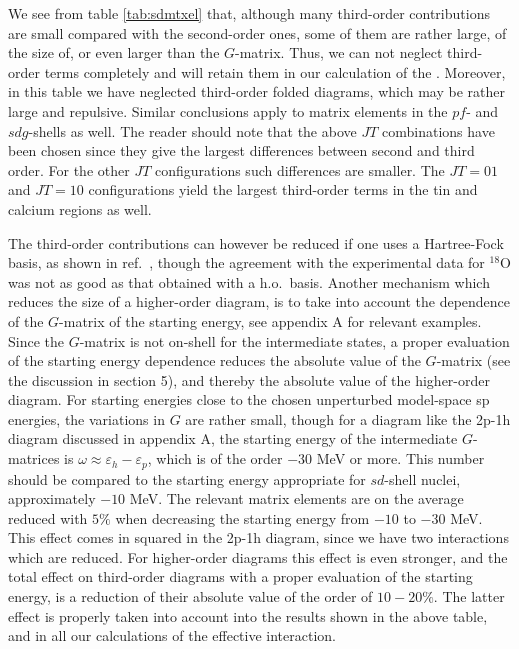 We see from table \ref{tab:sdmtxel} that, although many third-order
contributions are small compared with the second-order ones, some of
them are rather large, of the size of, or even larger than
the $G$-matrix. Thus, we can
not neglect third-order terms completely and will retain
them in our calculation of the \qbox. Moreover, in this table
we have neglected third-order folded diagrams,
which may be rather large and repulsive.
Similar conclusions apply to matrix
elements in the $pf$- and $sdg$-shells as well. The reader should
note that the above $JT$ combinations have been chosen since they
give the largest differences between second and third order.
For the other $JT$ configurations such differences are smaller.
The $JT=01$ and $JT=10$ configurations yield the largest third-order
terms
in the tin and calcium regions as well.

The third-order contributions can however be reduced if one uses
a Hartree-Fock basis, as shown in ref.\ \cite{homs90},
though the
agreement with the experimental data for $^{18}$O was not as good
as that obtained with a h.o.\ basis. Another mechanism which
reduces the size of a higher-order diagram, is to take into account
the
dependence of the $G$-matrix of the starting energy, see
appendix A for relevant examples. Since the $G$-matrix is not
on-shell for the intermediate states, a proper evaluation
of the starting energy dependence reduces the absolute value of
the $G$-matrix (see the discussion in section 5), and thereby
the absolute value of the higher-order diagram.
For starting energies close to the chosen unperturbed
model-space sp energies, the variations in $G$ are rather small,
though for a diagram like the 2p-1h diagram discussed in appendix
A, the starting energy of the intermediate $G$-matrices is
$\omega \approx \varepsilon_h -\varepsilon_p$, which is of the order
$-30$ MeV or more. This number should be compared to the
starting energy appropriate for $sd$-shell nuclei, approximately
$-10$ MeV. The relevant matrix elements are on the average
reduced with $5\%$ when decreasing the starting energy from
$-10$ to $-30$ MeV. This effect comes in squared in the 2p-1h
diagram, since we have two interactions which are reduced.
For higher-order diagrams this effect is even stronger, and the
total effect on third-order diagrams with a proper evaluation
of the starting energy, is a reduction of their absolute value
of the order of $10-20\%$. The latter effect is properly taken 
into account into the results shown in the above
table, and in all our calculations of the effective interaction.

